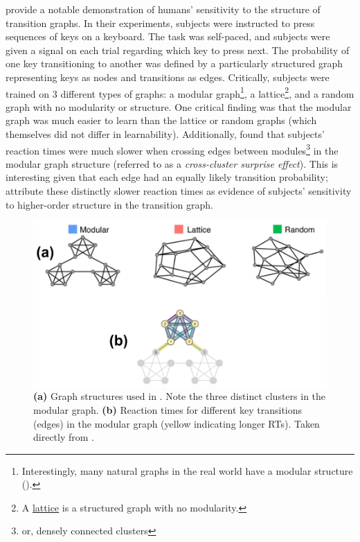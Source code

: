 \documentclass[12pt]{article}
\let\oldcite=\cite
\let\oldtextcite=\textcite
\renewcommand{\cite}[1]{\textcolor[rgb]{0, .121, .388}{\oldcite{#1}}}
\renewcommand{\textcite}[1]{\textcolor[rgb]{0, .121, .388}{\oldtextcite{#1}}}
\begin{document}
\textcite{kahn2018network} provide a notable demonstration of humans' sensitivity to the structure of transition graphs. In their experiments, subjects were instructed to press sequences of keys on a keyboard. The task was self-paced, and subjects were given a signal on each trial regarding which key to press next. The probability of one key transitioning to another was defined by a particularly structured graph representing keys as nodes and transitions as edges. Critically, subjects were trained on 3 different types of graphs: a modular graph\footnote{ Interestingly, many natural graphs in the real world have a modular structure (\cite{kahn2018network}).}, a lattice\footnote{ A \href{https://en.wikipedia.org/wiki/Lattice_graph}{lattice} is a structured graph with no modularity.}, and a random graph with no modularity or structure. One critical finding was that the modular graph was much easier to learn than the lattice or random graphs (which themselves did not differ in learnability). Additionally, \textcite{kahn2018network} found that subjects' reaction times were much slower when crossing edges between modules\footnote{or, densely connected clusters} in the modular graph structure (referred to as a \emph{cross-cluster surprise effect}). This is interesting given that each edge had an equally likely transition probability; \textcite{kahn2018network} attribute these distinctly slower reaction times as evidence of subjects' sensitivity to higher-order structure in the transition graph.

\begin{figure}[h]
    \centering
    \label{fig:kahn2018network-figures}
    \includegraphics[scale=.4]{figures/kahn2018network-figures.png}
    \caption[Kahn et al., 2018]{\textbf{(a)} Graph structures used in \textcite{kahn2018network}. Note the three distinct clusters in the modular graph. \textbf{(b)} Reaction times for different key transitions (edges) in the modular graph (yellow indicating longer RTs). Taken directly from \emph{\textcite{kahn2018network}}.}
\end{figure} 
\end{document}

